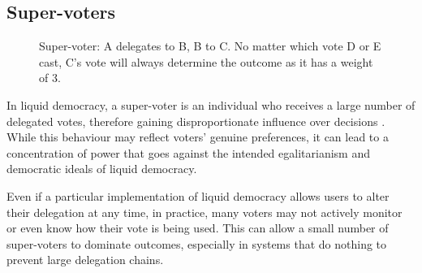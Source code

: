 \subsection*{Super-voters}
\begin{figure}[h]
    \centering
    \caption{Super-voter: A delegates to B, B to C. No matter which vote D or E cast, C's vote will always determine the outcome as it has a weight of 3.}
    \label{fig:delegation-supervoter}
\end{figure}
In liquid democracy, a super-voter is an individual who receives a large number of delegated votes, therefore gaining disproportionate influence over decisions \citep{kling2015votingbehaviourpoweronline}. While this behaviour may reflect voters' genuine preferences, it can lead to a concentration of power that goes against the intended egalitarianism and democratic ideals of liquid democracy.

Even if a particular implementation of liquid democracy allows users to alter their delegation at any time, in practice, many voters may not actively monitor or even know how their vote is being used. This can allow a small number of super-voters to dominate outcomes, especially in systems that do nothing to prevent large delegation chains.


